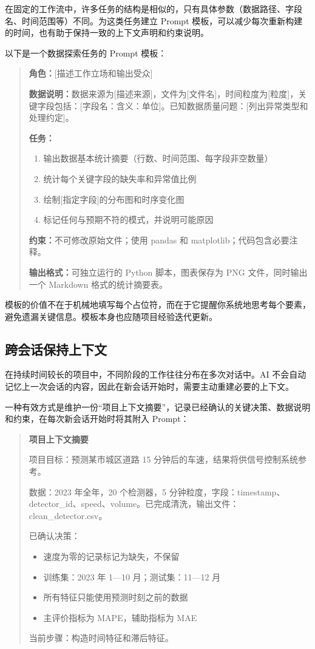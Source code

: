 在固定的工作流中，许多任务的结构是相似的，只有具体参数（数据路径、字段名、时间范围等）不同。为这类任务建立 Prompt 模板，可以减少每次重新构建的时间，也有助于保持一致的上下文声明和约束说明。

以下是一个数据探索任务的 Prompt 模板：

\begin{quote}
\textbf{角色：}[描述工作立场和输出受众]

\textbf{数据说明：}数据来源为[描述来源]，文件为[文件名]，时间粒度为[粒度]，关键字段包括：[字段名：含义：单位]。已知数据质量问题：[列出异常类型和处理约定]。

\textbf{任务：}
\begin{enumerate}
  \item 输出数据基本统计摘要（行数、时间范围、每字段非空数量）
  \item 统计每个关键字段的缺失率和异常值比例
  \item 绘制[指定字段]的分布图和时序变化图
  \item 标记任何与预期不符的模式，并说明可能原因
\end{enumerate}

\textbf{约束：}不可修改原始文件；使用 pandas 和 matplotlib；代码包含必要注释。

\textbf{输出格式：}可独立运行的 Python 脚本，图表保存为 PNG 文件，同时输出一个 Markdown 格式的统计摘要表。
\end{quote}

模板的价值不在于机械地填写每个占位符，而在于它提醒你系统地思考每个要素，避免遗漏关键信息。模板本身也应随项目经验迭代更新。

\subsection{跨会话保持上下文}

在持续时间较长的项目中，不同阶段的工作往往分布在多次对话中。AI 不会自动记忆上一次会话的内容，因此在新会话开始时，需要主动重建必要的上下文。

一种有效方式是维护一份“项目上下文摘要”，记录已经确认的关键决策、数据说明和约束，在每次新会话开始时将其附入 Prompt：

\begin{quote}
\textbf{项目上下文摘要}

项目目标：预测某市城区道路 15 分钟后的车速，结果将供信号控制系统参考。

数据：2023 年全年，20 个检测器，5 分钟粒度，字段：timestamp、detector\_id、speed、volume。已完成清洗，输出文件：clean\_detector.csv。

已确认决策：
\begin{itemize}
  \item 速度为零的记录标记为缺失，不保留
  \item 训练集：2023 年 1—10 月；测试集：11—12 月
  \item 所有特征只能使用预测时刻之前的数据
  \item 主评价指标为 MAPE，辅助指标为 MAE
\end{itemize}

当前步骤：构造时间特征和滞后特征。
\end{quote}

